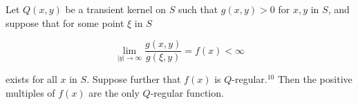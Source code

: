 Let $Q(x,y)$ be a transient kernel on $S$ such that $g(x,y) > 0$ for $x,y$ in $S$, and suppose that for some point $\xi$ in $S$

$$\lim_{|y| \to \infty} \frac{g(x,y)}{g(\xi,y)} = f(x) < \infty$$

exists for all $x$ in $S$. Suppose further that $f(x)$ is $Q$-regular.$^{10}$ Then the positive multiples of $f(x)$ are the only $Q$-regular function.